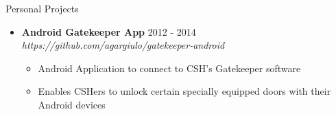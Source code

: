 \documentclass[10pt,oneside]{article}
\newenvironment{ressection}[1]{
	\vspace{3pt}
	{\fontfamily{ppl}\selectfont\Large#1}
	\begin{itemize}
	\vspace{2pt}
}{
	\end{itemize}
}
\newcommand{\ressubitem}[1]{
	\vspace{-1pt}
	\item \begin{flushleft} #1 \end{flushleft}
}
\newcommand{\resaltitem}[3]{
	\vspace{-3pt}
	\item
	\textbf{#1} \hfill #2 \\
	\textit{#3}
}
\newenvironment{resaltsec}[3]{
	\resaltitem{#1}{#2}{#3}
	\vspace{-1pt}
	\begin{itemize}
}{
	\end{itemize}
}
\begin{document}
\begin{ressection}{Personal Projects}


	\begin{resaltsec}{Android Gatekeeper App}{2012 - 2014}{https://github.com/agargiulo/gatekeeper-android}
		\ressubitem{Android Application to connect to CSH's Gatekeeper software}
		\ressubitem{Enables CSHers to unlock certain specially equipped doors with their Android devices}
	\end{resaltsec}


\end{ressection}
\end{document}
